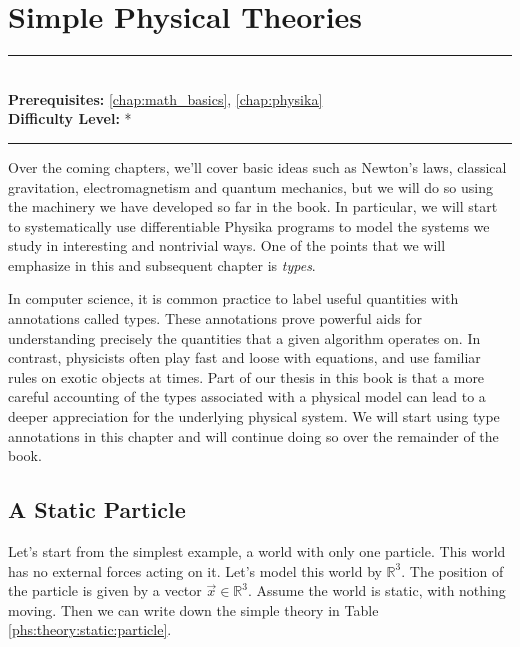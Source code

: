 \documentclass[book.tex]{subfiles}
\begin{document}
\chapter{Simple Physical Theories}
\label{chap:simple_physics}
\noindent\rule{11cm}{0.4pt} \\
\textbf{Prerequisites:} \autoref{chap:math_basics}, \autoref{chap:physika} \\
\textbf{Difficulty Level:} * \\
\noindent\rule{11cm}{0.4pt}
\vspace{5mm}

Over the coming chapters, we'll cover basic ideas such as Newton's laws, classical gravitation, electromagnetism and quantum mechanics, but we will do so using the machinery we have developed so far in the book. In particular, we will start to systematically use differentiable Physika programs to model the systems we study in interesting and nontrivial ways. One of the points that we will emphasize in this and subsequent chapter is \textit{types}. 

In computer science, it is common practice to label useful quantities with annotations called types. These annotations prove powerful aids for understanding precisely the quantities that a given algorithm operates on. In contrast, physicists often play fast and loose with equations, and use familiar rules on exotic objects at times. Part of our thesis in this book is that a more careful accounting of the types associated with a physical model can lead to a deeper appreciation for the underlying physical system. We will start using type annotations in this chapter and will continue doing so over the remainder of the book.

\section{A Static Particle}

Let's start from the simplest example, 
a world with only one particle. This world has no external forces acting on it. Let's model this world by $\mathbb{R}^3$. The position of the particle is given by a vector $\vec{x} \in \mathbb{R}^3$. Assume the world is static, with nothing moving. Then we can write down the simple theory in Table \ref{phs:theory:static:particle}.
\end{document}
